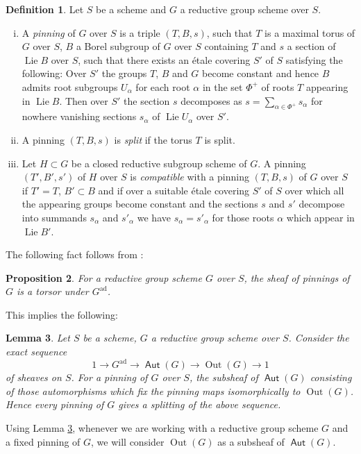 \documentclass{article}
\DeclareMathOperator{\Lie}{Lie}
\DeclareMathOperator{\Aut}{\mathsf{Aut}}
\DeclareMathOperator{\Out}{Out}
\theoremstyle{definition}
\newtheorem{definition}{Definition}[section]
\theoremstyle{plain}
\newtheorem{proposition}[definition]{Proposition}
\newtheorem{lemma}[definition]{Lemma}
\begin{document}
\begin{definition} \label{PinnDef}
  Let $S$ be a scheme and $G$ a reductive group scheme over $S$. %
  \begin{enumerate}[(i)]
 \item  A \emph{pinning} of $G$  over $S$ is a triple $(T,B,s)$, such that $T$ is a maximal torus of $G$ over $S$, $B$ a Borel subgroup of $G$ over $S$ containing $T$ and $s$ a section of $\Lie B$ over $S$, such that there exists an \'etale covering $S'$ of $S$ satisfying the following: Over $S'$ the groups $T$, $B$ and $G$ become constant and hence $B$ admits root subgroups $U_\alpha$ for each root $\alpha$ in the set $\Phi^+$ of roots $T$ appearing in $\Lie B$. Then over $S'$ the section $s$ decomposes as $s=\sum_{\alpha \in \Phi^+} s_\alpha$ for nowhere vanishing sections $s_\alpha$ of $\Lie U_\alpha$ over $S'$.
 \item A pinning $(T,B,s)$ is \emph{split} if the torus $T$ is split.
  \item Let $H\subset G$ be a closed reductive subgroup scheme of $G$. A pinning $(T',B',s')$ of $H$ over $S$ is \emph{compatible} with a pinning $(T,B,s)$ of $G$ over $S$ if $T'=T$, $B'\subset B$ and if over a suitable \'etale covering $S'$ of $S$ over which all the appearing groups become constant and the sections $s$ and $s'$ decompose into summands $s_\alpha$ and $s'_\alpha$ we have $s_\alpha=s'_\alpha$ for those roots $\alpha$ which appear in $\Lie B'$.
  \end{enumerate}
\end{definition}

The following fact follows from \cite[XXIV.3.10]{SGA3III}:
\begin{proposition}
  For a reductive group scheme $G$ over $S$, the sheaf of pinnings of $G$ is a torsor under $G^\text{ad}$.  
\end{proposition}
 This implies the following:
\begin{lemma} \label{PinnSplit}
  Let $S$ be a scheme, $G$ a reductive group scheme over $S$. Consider the exact sequence
  \begin{equation*}
    1 \to G^\text{ad} \to \Aut(G) \to \Out(G) \to 1
  \end{equation*}
of sheaves on $S$. For a pinning of $G$ over $S$, the subsheaf of $\Aut(G)$ consisting of those automorphisms which fix the pinning maps isomorphically to $\Out(G)$. Hence every pinning of $G$ gives a splitting of the above sequence.
\end{lemma}
Using Lemma \ref{PinnSplit}, whenever we are working with a reductive group scheme $G$ and a fixed pinning of $G$, we will consider $\Out(G)$ as a subsheaf of $\Aut(G)$.
\end{document}
